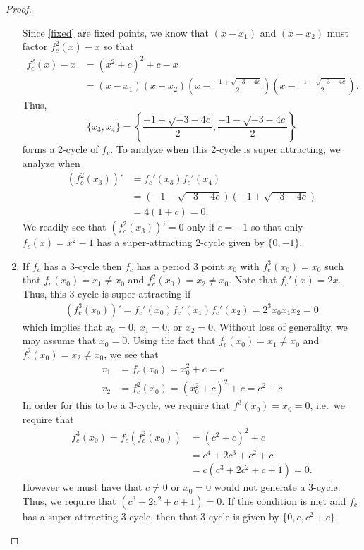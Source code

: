 \begin{proof}
\begin{enumerate}
      Since \eqref{fixed} are fixed points, we know that $(x- x_1)$ and $(x- x_2)$ must factor
      $f_c^2(x) - x$ so that
      \begin{align*}
        f_c^2(x) - x &= \left(x^2 + c\right)^2 + c - x \\
        &= \left(x-x_1\right)\left(x-x_2\right)
        \left(x - \frac{-1 + \sqrt{-3 - 4 c}}{2}\right)\left(x - \frac{-1 - \sqrt{-3 - 4 c}}{2}\right).
      \end{align*}
      Thus,
      $$\{x_3, x_4\} = \left\{\frac{-1 + \sqrt{-3 - 4 c}}{2}, \frac{-1 - \sqrt{-3 - 4 c}}{2}\right\}$$
      forms a 2-cycle of $f_c$. To analyze when this 2-cycle is super attracting, we analyze when
      \begin{align*}
        (f_c^2(x_3))' &= f_c'(x_3)f_c'(x_4) \\
        &= \left(-1 - \sqrt{-3 - 4 c}\right)\left(-1 + \sqrt{-3 - 4 c}\right) \\
        &= 4(1 + c) = 0.
      \end{align*}
      We readily see that $(f_c^2(x_3))' = 0$ only if $c= -1$ so that only $f_c(x) = x^2 - 1$
      has a super-attracting 2-cycle given by $\{0, -1\}$.
    \item If $f_c$ has a 3-cycle
      then $f_c$ has a period 3 point $x_0$ with $f_c^3(x_0) = x_0$ such that $f_c(x_0) = x_1 \neq x_0$
      and $f_c^2(x_0) = x_2 \neq x_0$. Note that $f_c'(x) = 2x$. Thus, this 3-cycle is super attracting
      if
      \begin{align*}
        (f_c^3(x_0))' = f_c'(x_0)f_c'(x_1)f_c'(x_2) = 2^3 x_0x_1x_2 = 0
      \end{align*}
      which implies that $x_0 = 0$, $x_1=0$, or $x_2=0$. Without loss of generality,
      we may assume that $x_0 = 0$. Using the fact that $f_c(x_0) = x_1 \neq x_0$ and $f_c^2(x_0) = x_2 \neq x_0$,
      we see that
      \begin{align*}
        x_1 &= f_c(x_0) = x_0^2 + c = c \\
        x_2 &= f_c^2(x_0) = (x_0^2 + c)^2 + c = c^2 + c
      \end{align*}
      In order for this to be a 3-cycle, we require that $f^3(x_0) = x_0 = 0$, i.e.\
      we require that
      \begin{align*}
        f_c^3(x_0) = f_c(f_c^2(x_0)) &= (c^2 + c)^2 + c \\
        &= c^4 + 2c^3 + c^2 + c \\
        &= c(c^3 + 2c^2 + c + 1) = 0.
      \end{align*}
      However we must have that $c \neq 0$ or $x_0 = 0$ would not generate a 3-cycle. Thus, we require that
      $(c^3 + 2c^2 + c + 1) = 0$. If this condition is met and $f_c$ has a super-attracting 3-cycle,
      then that 3-cycle is given by $\{0, c, c^2 + c\}$.
  \end{enumerate}
\end{proof}
\newpage
